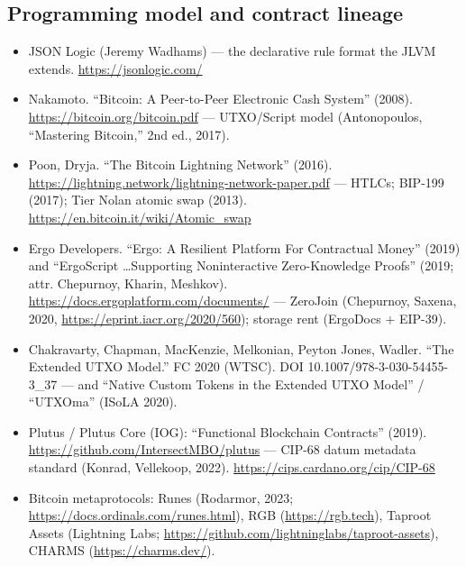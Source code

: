 \documentclass[11pt,a4paper]{article}
\begin{document}
\subsection*{Programming model and contract lineage}
\begin{itemize}
    \item JSON Logic (Jeremy Wadhams) --- the declarative rule format the JLVM extends. \url{https://jsonlogic.com/}
    \item Nakamoto. ``Bitcoin: A Peer-to-Peer Electronic Cash System'' (2008). \url{https://bitcoin.org/bitcoin.pdf} --- UTXO/Script model (Antonopoulos, ``Mastering Bitcoin,'' 2nd ed., 2017).
    \item Poon, Dryja. ``The Bitcoin Lightning Network'' (2016). \url{https://lightning.network/lightning-network-paper.pdf} --- HTLCs; BIP-199 (2017); Tier Nolan atomic swap (2013). \url{https://en.bitcoin.it/wiki/Atomic_swap}
    \item Ergo Developers. ``Ergo: A Resilient Platform For Contractual Money'' (2019) and ``ErgoScript \ldots Supporting Noninteractive Zero-Knowledge Proofs'' (2019; attr. Chepurnoy, Kharin, Meshkov). \url{https://docs.ergoplatform.com/documents/} --- ZeroJoin (Chepurnoy, Saxena, 2020, \url{https://eprint.iacr.org/2020/560}); storage rent (ErgoDocs + EIP-39).
    \item Chakravarty, Chapman, MacKenzie, Melkonian, Peyton Jones, Wadler. ``The Extended UTXO Model.'' FC 2020 (WTSC). DOI 10.1007/978-3-030-54455-3\_37 --- and ``Native Custom Tokens in the Extended UTXO Model'' / ``UTXOma'' (ISoLA 2020).
    \item Plutus / Plutus Core (IOG): ``Functional Blockchain Contracts'' (2019). \url{https://github.com/IntersectMBO/plutus} --- CIP-68 datum metadata standard (Konrad, Vellekoop, 2022). \url{https://cips.cardano.org/cip/CIP-68}
    \item Bitcoin metaprotocols: Runes (Rodarmor, 2023; \url{https://docs.ordinals.com/runes.html}), RGB (\url{https://rgb.tech}), Taproot Assets (Lightning Labs; \url{https://github.com/lightninglabs/taproot-assets}), CHARMS (\url{https://charms.dev/}).
\end{itemize}
\end{document}
